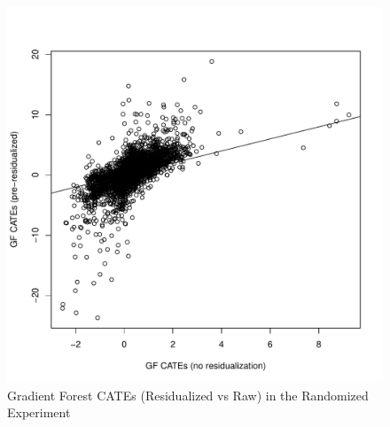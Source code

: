 \documentclass{article}
\begin{document}
  \begin{figure}[!ht]
\center
\caption{Gradient Forest CATEs (Residualized vs Raw) in the Randomized Experiment}
\label{gfres_random}
\includegraphics[scale=.8]{residGFcomp_random.pdf}
\end{figure}
 
\end{document}
